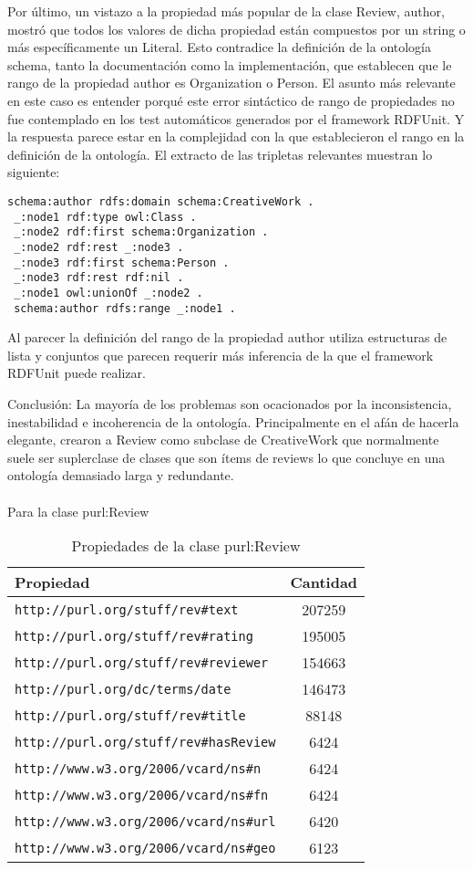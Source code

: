  Por último, un vistazo a la propiedad más popular de la clase Review, author, mostró que todos los valores de dicha propiedad están compuestos 
 por un string o más específicamente un Literal. Esto contradice la definición de la ontología schema, tanto la documentación como la implementación, que
 establecen que le rango de la propiedad author es Organization o Person. 
 El asunto más relevante en este caso es entender porqué este error sintáctico de rango de propiedades no fue contemplado en los test 
 automáticos generados por el framework RDFUnit.
 Y la respuesta parece estar en la complejidad con la que establecieron el rango en la definición de la ontología. El extracto de las 
 tripletas relevantes muestran lo siguiente:
 \begin{lstlisting}[frame=single]
 schema:author rdfs:domain schema:CreativeWork .
 _:node1 rdf:type owl:Class .
 _:node2 rdf:first schema:Organization .
 _:node2 rdf:rest _:node3 .
 _:node3 rdf:first schema:Person .
 _:node3 rdf:rest rdf:nil .
 _:node1 owl:unionOf _:node2 .
 schema:author rdfs:range _:node1 .
 \end{lstlisting}
 
 Al parecer la definición del rango de la propiedad author utiliza estructuras de lista y conjuntos que parecen requerir más inferencia de la 
 que el framework RDFUnit puede realizar.
 
 Conclusión: La mayoría de los problemas son ocacionados por la inconsistencia, inestabilidad e incoherencia de la ontología. Principalmente 
 en el afán de hacerla elegante, crearon a Review como subclase de CreativeWork que normalmente suele ser suplerclase de clases que son ítems de reviews
 lo que concluye en una ontología demasiado larga y redundante.
 \\
 \\
 Para la clase purl:Review\\
 \begin{table}[h]
 \begin{tabular}{| l | c | }\hline
 Propiedad & Cantidad \\\hline
 \verb|http://purl.org/stuff/rev#text| & 207259\\
 \verb|http://purl.org/stuff/rev#rating| & 195005\\
 \verb|http://purl.org/stuff/rev#reviewer| & 154663\\
 \verb|http://purl.org/dc/terms/date| & 146473\\
 \verb|http://purl.org/stuff/rev#title| & 88148\\
 \verb|http://purl.org/stuff/rev#hasReview| & 6424\\
 \verb|http://www.w3.org/2006/vcard/ns#n| & 6424\\
 \verb|http://www.w3.org/2006/vcard/ns#fn| & 6424\\
 \verb|http://www.w3.org/2006/vcard/ns#url| & 6420\\
 \verb|http://www.w3.org/2006/vcard/ns#geo| & 6123\\\hline
\end{tabular}
\caption{Propiedades de la clase purl:Review}
\label{table:PropertiesStatisticsPurl}
\end{table}
\\ 

